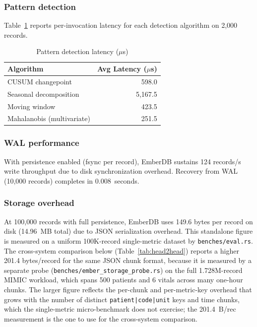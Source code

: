 \documentclass[journal]{IEEEtran}
\begin{document}
\subsubsection{Pattern detection}
Table~\ref{tab:pattern} reports per-invocation latency for each detection algorithm on 2{,}000 records.

\begin{table}[htbp]
\centering
\caption{Pattern detection latency ($\mu$s)}
\label{tab:pattern}
\begin{tabular}{lr}
\toprule
\textbf{Algorithm} & \textbf{Avg Latency ($\mu$s)} \\
\midrule
CUSUM changepoint & 598.0 \\
Seasonal decomposition & 5{,}167.5 \\
Moving window & 423.5 \\
Mahalanobis (multivariate) & 251.5 \\
\bottomrule
\end{tabular}
\end{table}

\subsubsection{WAL performance}
With persistence enabled (fsync per record), EmberDB sustains 124 records/s write throughput due to disk synchronization overhead.
Recovery from WAL (10{,}000 records) completes in 0.008~seconds.

\subsubsection{Storage overhead}
At 100{,}000 records with full persistence, EmberDB uses 149.6 bytes per record on disk (14.96~MB total) due to JSON serialization overhead.
This standalone figure is measured on a uniform 100K-record single-metric dataset by \texttt{benches/eval.rs}. The cross-system comparison below (Table~\ref{tab:head2head}) reports a higher 201.4 bytes/record for the same JSON chunk format, because it is measured by a separate probe (\texttt{benches/ember\_storage\_probe.rs}) on the full 1.728M-record MIMIC workload, which spans 500 patients and 6 vitals across many one-hour chunks. The larger figure reflects the per-chunk and per-metric-key overhead that grows with the number of distinct \texttt{patient|code|unit} keys and time chunks, which the single-metric micro-benchmark does not exercise; the 201.4~B/rec measurement is the one to use for the cross-system comparison.
\end{document}
